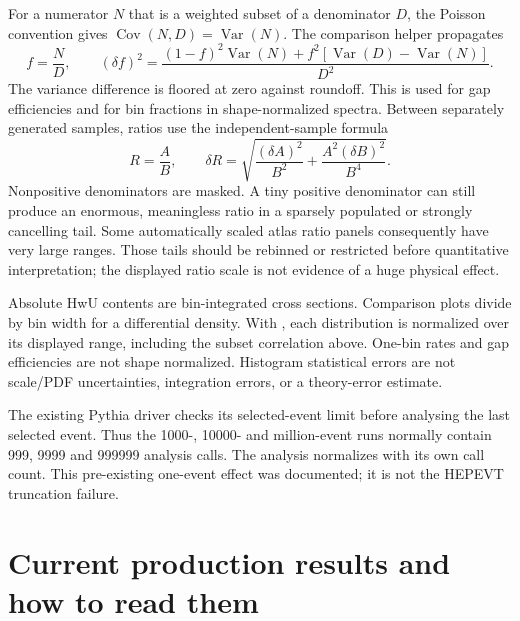 \documentclass[11pt,a4paper]{article}
\newcommand{\code}[1]{\texttt{\detokenize{#1}}}
\begin{document}
For a numerator $N$ that is a weighted subset of a denominator $D$, the
Poisson convention gives $\operatorname{Cov}(N,D)=\operatorname{Var}(N)$.
The comparison helper propagates
\begin{equation}
 f=\frac ND,\qquad
 (\delta f)^2=\frac{(1-f)^2\operatorname{Var}(N)
              +f^2[\operatorname{Var}(D)-\operatorname{Var}(N)]}{D^2}.
\end{equation}
The variance difference is floored at zero against roundoff. This is used
for gap efficiencies and for bin fractions in shape-normalized spectra.
Between separately generated samples, ratios use the independent-sample
formula
\begin{equation}
 R=\frac AB,\qquad
 \delta R=\sqrt{\frac{(\delta A)^2}{B^2}
                   +\frac{A^2(\delta B)^2}{B^4}}.
\end{equation}
Nonpositive denominators are masked. A tiny positive denominator can still
produce an enormous, meaningless ratio in a sparsely populated or strongly
cancelling tail. Some automatically scaled atlas ratio panels consequently
have very large ranges. Those tails should be rebinned or restricted before
quantitative interpretation; the displayed ratio scale is not evidence of
a huge physical effect.

Absolute HwU contents are bin-integrated cross sections. Comparison plots
divide by bin width for a differential density. With \code{--shape}, each
distribution is normalized over its displayed range, including the subset
correlation above. One-bin rates and gap efficiencies are not shape
normalized. Histogram statistical errors are not scale/PDF uncertainties,
integration errors, or a theory-error estimate.

The existing Pythia driver checks its selected-event limit before analysing
the last selected event. Thus the 1000-, 10000- and million-event runs
normally contain 999, 9999 and 999999 analysis calls. The analysis
normalizes with its own call count. This pre-existing one-event effect was
documented; it is not the HEPEVT truncation failure.

\section{Current production results and how to read them}\label{sec:results}
\end{document}
